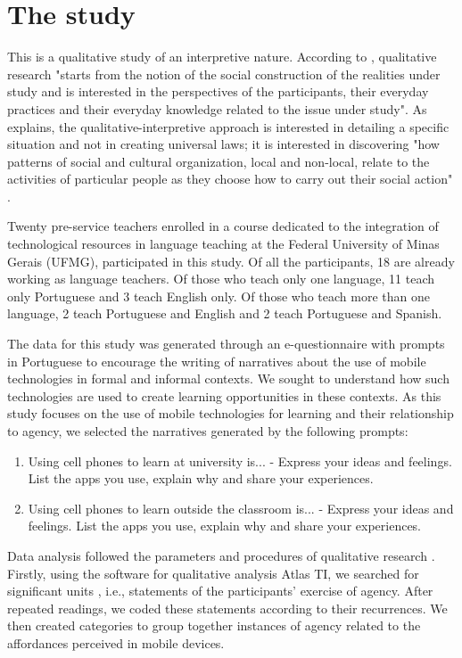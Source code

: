 \section{The study}\label{sec-thestudy}

This is a qualitative study of an interpretive nature. According to \textcite[p. 16]{flick2009}, qualitative research "starts from the notion of the social construction of the realities under study and is interested in the perspectives of the participants, their everyday practices and their everyday knowledge related to the issue under study". As \textcite{bortoni2008} explains, the qualitative-interpretive approach is interested in detailing a specific situation and not in creating universal laws; it is interested in discovering "how patterns of social and cultural organization, local and non-local, relate to the activities of particular people as they choose how to carry out their social action" \cite[p. 41]{bortoni2008}.


Twenty pre-service teachers enrolled in a course dedicated to the integration of technological resources in language teaching at the Federal University of Minas Gerais (UFMG), participated in this study. Of all the participants, 18 are already working as language teachers. Of those who teach only one language, 11 teach only Portuguese and 3 teach English only. Of those who teach more than one language, 2 teach Portuguese and English and 2 teach Portuguese and Spanish.


The data for this study was generated through an e-questionnaire with prompts in Portuguese to encourage the writing of narratives about the use of mobile technologies in formal and informal contexts. We sought to understand how such technologies are used to create learning opportunities in these contexts. As this study focuses on the use of mobile technologies for learning and their relationship to agency, we selected the narratives generated by the following prompts:

\begin{enumerate}[label=\alph*)]
	\item Using cell phones to learn at university is... - Express your ideas and feelings. List the apps you use, explain why and share your experiences.
	\item Using cell phones to learn outside the classroom is... - Express your ideas and feelings. List the apps you use, explain why and share your experiences.
\end{enumerate}

Data analysis followed the parameters and procedures of qualitative research \cite{dornyei_research_2007}. Firstly, using the software for qualitative analysis Atlas TI, we searched for significant units \cite{holliday_doing_2016}, i.e., statements of the participants' exercise of agency. After repeated readings, we coded these statements according to their recurrences. We then created categories to group together instances of agency related to the affordances perceived in mobile devices.